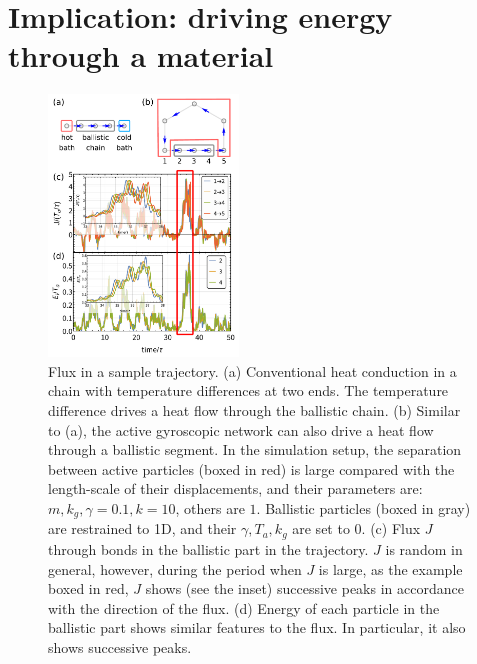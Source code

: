 \documentclass[
 preprint,
 preprintnumbers,
 amsmath,amssymb,
 aps,
 pre,
 longbibliography,
 10pt, twocolumn
]{revtex4-1}
\begin{document}
\section{Implication: driving energy through a material} \label{sec:simulation}
\begin{figure}[ht]
	\centering
	\includegraphics[width=0.45\textwidth]{6_simulation.pdf}
    \caption{Flux in a sample trajectory.
    (a) Conventional heat conduction in a chain with temperature differences at two ends. The temperature difference drives a heat flow through the ballistic chain.
    (b) Similar to (a), the active gyroscopic network can also drive a heat flow through a ballistic segment. In the simulation setup, the separation between active particles (boxed in red) is large compared with the length-scale of their displacements, and their parameters are: $m,k_g,\gamma=0.1, k=10$, others are $1$. Ballistic particles (boxed in gray) are restrained to 1D, and their $\gamma,T_a,k_g$ are set to $0$.
    (c) Flux $J$ through bonds in the ballistic part in the trajectory. $J$ is random in general, however, during the period when $J$ is large, as the example boxed in red, $J$ shows (see the inset) successive peaks in accordance with the direction of the flux.
    (d) Energy of each particle in the ballistic part shows similar features to the flux. In particular, it also shows successive peaks.
    }
    \label{fig:simulation}
\end{figure}
\end{document}
